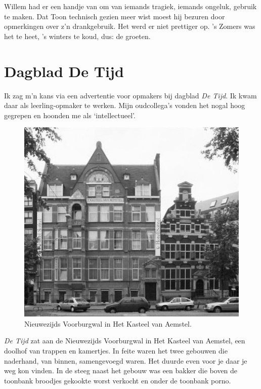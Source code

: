 \documentclass[12pt,twoside, openright]{memoir}
\begin{document}
Willem had er een handje van om van iemands tragiek, iemands ongeluk, gebruik te maken. Dat Toon technisch gezien meer wist moest hij bezuren door opmerkingen over z’n drankgebruik. Het werd er niet prettiger op. ’s Zomers was het te heet, ’s winters te koud, dus: de groeten.

\section*{Dagblad De Tijd} %
\label{cha:detijd}

Ik zag m’n kans via een advertentie voor opmakers bij dagblad \emph{De Tijd}. Ik kwam daar als leerling-opmaker te werken. Mijn oudcollega’s vonden het nogal hoog gegrepen en hoonden me als `intellectueel'.

\begin{figure}
\centering
\includegraphics[width=\textwidth]{img/230DeTijd}
\caption*{\footnotesize Nieuwezijds Voorburgwal in Het Kasteel van Aemstel.}
\end{figure}

\emph{De Tijd} zat aan de Nieuwezijds Voorburgwal in Het Kasteel van Aemstel, een doolhof van trappen en kamertjes. In feite waren het twee gebouwen die naderhand, van binnen, samengevoegd waren. Het duurde even voor je daar je weg kon vinden. In de steeg naast het gebouw was een bakker die boven de toonbank broodjes gekookte worst verkocht en onder de toonbank porno. 
\end{document}
